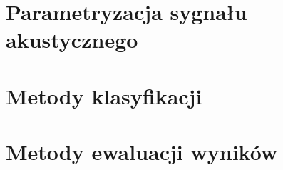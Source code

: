 
\section{Parametryzacja sygnału akustycznego}
\label{sec:parametryzacja-sygnalu-akustycznego}


\section{Metody klasyfikacji}
\label{sec:klasyfikacja}


\section{Metody ewaluacji wyników}
\label{sec:metody-ewaluacji-wyników}